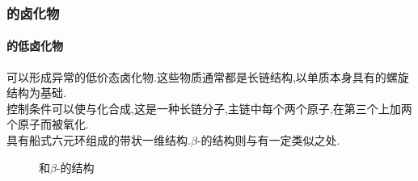 \documentclass{ctexart}
\begin{document}
\subsubsection{的卤化物}
\paragraph{的低卤化物}
可以形成异常的低价态卤化物.这些物质通常都是长链结构,以单质本身具有的螺旋结构为基础.\\
\indent 控制条件可以使与化合成,这是一种长链分子,主链中每个两个原子,在第三个上加两个原子而被氧化.\\
\indent {}具有船式六元环组成的带状一维结构.$\beta$-的结构则与有一定类似之处.
\begin{figure}[H]
    \centering
    \caption{和$\beta$-的结构}
\end{figure}
\end{document}
